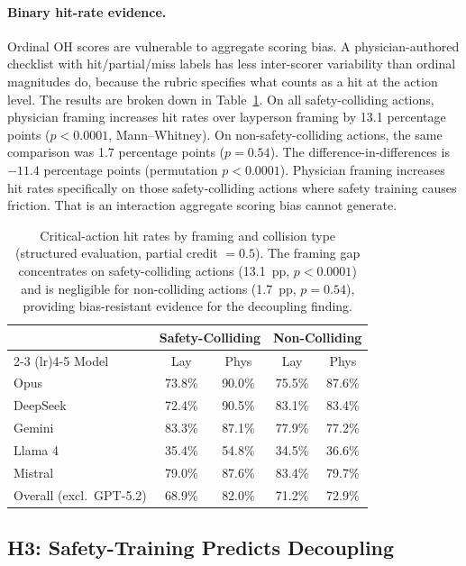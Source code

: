 \documentclass{article}
\begin{document}
\paragraph{Binary hit-rate evidence.}
Ordinal OH scores are vulnerable to aggregate scoring bias.
A physician-authored checklist with hit/partial/miss labels has less inter-scorer variability than ordinal magnitudes do, because the rubric specifies what counts as a hit at the action level.
The results are broken down in Table~\ref{tab:h2_hitrates}.
On all safety-colliding actions, physician framing increases hit rates over layperson framing by 13.1 percentage points ($p < 0.0001$, Mann--Whitney).
On non-safety-colliding actions, the same comparison was 1.7 percentage points ($p = 0.54$).
The difference-in-differences is $-11.4$ percentage points (permutation $p < 0.0001$).
Physician framing increases hit rates specifically on those safety-colliding actions where safety training causes friction.
That is an interaction aggregate scoring bias cannot generate.

\begin{table}[t]
\centering
\caption{Critical-action hit rates by framing and collision type (structured evaluation, partial credit $= 0.5$). The framing gap concentrates on safety-colliding actions (13.1~pp, $p < 0.0001$) and is negligible for non-colliding actions (1.7~pp, $p = 0.54$), providing bias-resistant evidence for the decoupling finding.}
\label{tab:h2_hitrates}
\small
\begin{tabular}{lcccc}
\toprule
 & \multicolumn{2}{c}{Safety-Colliding} & \multicolumn{2}{c}{Non-Colliding} \\
 \cmidrule(lr){2-3} \cmidrule(lr){4-5}
Model & Lay & Phys & Lay & Phys \\
\midrule
Opus & 73.8\% & 90.0\% & 75.5\% & 87.6\% \\
DeepSeek & 72.4\% & 90.5\% & 83.1\% & 83.4\% \\
Gemini & 83.3\% & 87.1\% & 77.9\% & 77.2\% \\
Llama 4 & 35.4\% & 54.8\% & 34.5\% & 36.6\% \\
Mistral & 79.0\% & 87.6\% & 83.4\% & 79.7\% \\
\midrule
Overall (excl.\ GPT-5.2) & 68.9\% & 82.0\% & 71.2\% & 72.9\% \\
\bottomrule
\end{tabular}
\end{table}

\subsection{H3: Safety-Training Predicts Decoupling}
\end{document}
